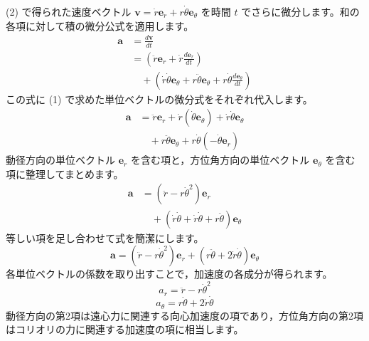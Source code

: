 \begin{solutionparts}
(2) で得られた速度ベクトル $\boldsymbol{v} = \dot{r} \boldsymbol{e}_r + r \dot{\theta} \boldsymbol{e}_\theta$ を時間 $t$ でさらに微分します。和の各項に対して積の微分公式を適用します。
\begin{align*}
\boldsymbol{a}
  &= \frac{d\boldsymbol{v}}{dt} \\
  &= \left(\ddot{r}\boldsymbol{e}_r
     +\dot{r}\frac{d\boldsymbol{e}_r}{dt}\right) \\
  &\quad +\left(\dot{r}\dot{\theta}\boldsymbol{e}_\theta
     +r\ddot{\theta}\boldsymbol{e}_\theta
     +r\dot{\theta}\frac{d\boldsymbol{e}_\theta}{dt}\right)
\end{align*}
この式に (1) で求めた単位ベクトルの微分式をそれぞれ代入します。
\begin{align*}
\boldsymbol{a}
  &= \ddot{r}\boldsymbol{e}_r
   + \dot{r}(\dot{\theta}\boldsymbol{e}_\theta)
   + \dot{r}\dot{\theta}\boldsymbol{e}_\theta \\
  &\quad +r\ddot{\theta}\boldsymbol{e}_\theta
   +r\dot{\theta}(-\dot{\theta}\boldsymbol{e}_r)
\end{align*}
動径方向の単位ベクトル $\boldsymbol{e}_r$ を含む項と，方位角方向の単位ベクトル $\boldsymbol{e}_\theta$ を含む項に整理してまとめます。
\begin{align*}
\boldsymbol{a}
  &= (\ddot{r}-r\dot{\theta}^2)\boldsymbol{e}_r \\
  &\quad +(\dot{r}\dot{\theta}+\dot{r}\dot{\theta}
     +r\ddot{\theta})\boldsymbol{e}_\theta
\end{align*}
等しい項を足し合わせて式を簡潔にします。
\begin{equation*}
\boldsymbol{a} = (\ddot{r} - r \dot{\theta}^2) \boldsymbol{e}_r + (r \ddot{\theta} + 2 \dot{r} \dot{\theta}) \boldsymbol{e}_\theta
\end{equation*}
各単位ベクトルの係数を取り出すことで，加速度の各成分が得られます。
\begin{equation*}
a_r = \ddot{r} - r \dot{\theta}^2
\end{equation*}
\begin{equation*}
a_\theta = r \ddot{\theta} + 2 \dot{r} \dot{\theta}
\end{equation*}
動径方向の第2項は遠心力に関連する向心加速度の項であり，方位角方向の第2項はコリオリの力に関連する加速度の項に相当します。

\end{solutionparts}
